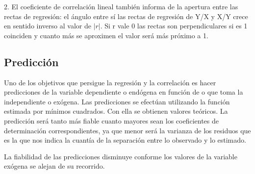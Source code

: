 \documentclass{article}
\begin{document}
2. El coeficiente de correlación lineal también informa de la apertura entre las rectas de regresión: el ángulo entre sí las rectas de regresión de Y/X y X/Y crece en sentido inverso al valor de $ |r| $. Si r vale 0 las rectas son perpendiculares si es 1 coinciden y cuanto más se aproximen el valor será más próximo a 1.

\subsection{Predicción}

Uno de los objetivos que persigue la regresión y la correlación es hacer predicciones de la variable dependiente o endógena en función de o que toma la independiente o exógena. Las predicciones se efectúan utilizando la función estimada por mínimos cuadrados. Con ella se obtienen valores teóricos. La predicción será tanto más fiable cuanto mayores sean los coeficientes de determinación correspondientes, ya que menor será la varianza de los residuos que es la que nos indica la cuantía de la separación entre lo observado y lo estimado.

La fiabilidad de las predicciones disminuye conforme los valores de la variable exógena se alejan de su recorrido.

 
\end{document}
